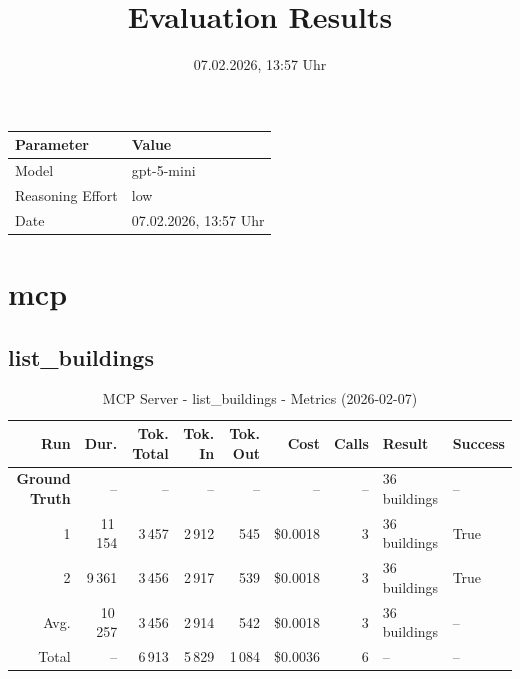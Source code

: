\documentclass[a4paper,11pt]{article}
\title{Evaluation Results}
\date{07.02.2026, 13:57 Uhr}
\begin{document}
\maketitle

\begin{table}[H]
\centering
\begin{tabular}{l l}
\toprule
\textbf{Parameter} & \textbf{Value} \\
\midrule
Model & gpt-5-mini \\
Reasoning Effort & low \\
Date & 07.02.2026, 13:57 Uhr \\
\bottomrule
\end{tabular}
\end{table}

\tableofcontents
\clearpage

\section{mcp}

\subsection{list\_buildings}

\begin{table}[ht]
\centering
\scriptsize
\caption{MCP Server - list\_buildings - Metrics (2026-02-07)}
\label{tab:mcp\_list\_buildings\_metrics\_2026-02-07}
\begin{tabular}{r r r r r r r p{3cm} l}
\hline
Run & Dur. & Tok. Total & Tok. In & Tok. Out & Cost & Calls & Result & Success \\
\hline
\textbf{Ground Truth} & -- & -- & -- & -- & -- & -- & 36 buildings & -- \\
\hline
1 & 11\,154 & 3\,457 & 2\,912 & 545 & \$0.0018 & 3 & 36 buildings & True \\
2 & 9\,361 & 3\,456 & 2\,917 & 539 & \$0.0018 & 3 & 36 buildings & True \\
\hline
Avg. & 10\,257 & 3\,456 & 2\,914 & 542 & \$0.0018 & 3 & 36 buildings & -- \\
Total & -- & 6\,913 & 5\,829 & 1\,084 & \$0.0036 & 6 & -- & -- \\
\hline
\end{tabular}
\end{table}

\clearpage
\end{document}
